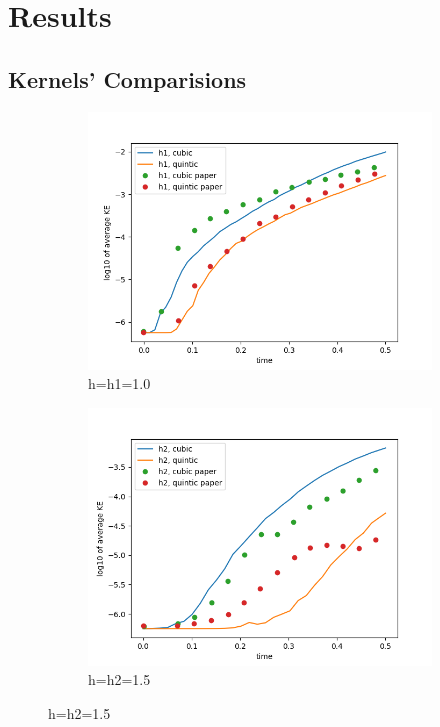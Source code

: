 \documentclass{beamer}
\begin{document}
\section{Results}
\subsection{Kernels' Comparisions}
\begin{frame}
\begin{figure}[H]
\centering
\begin{subfigure}[b]{0.33\textwidth}
\includegraphics[width=\linewidth]{./case10.png}
\caption{h=h1=1.0}
\end{subfigure}
\begin{subfigure}[b]{0.33\textwidth}
\includegraphics[width=\linewidth]{./case11.png}
\caption{h=h2=1.5}
\end{subfigure}


\end{figure}
\end{frame}
\end{document}
